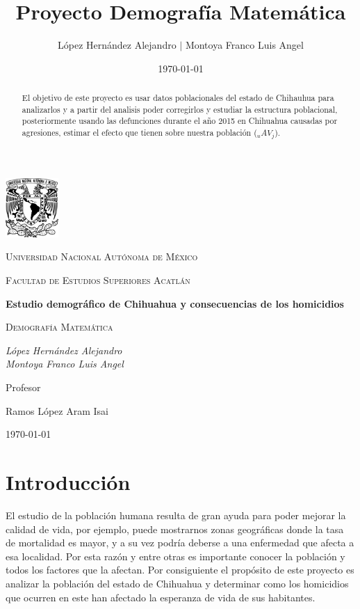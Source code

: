 \documentclass[fontsize=11pt]{article}
\title{Proyecto Demografía Matemática}
\author{  López Hernández Alejandro $|$ Montoya Franco Luis Angel} %
\date{\normalsize\today} %
\begin{document}
\begin{titlepage}
	\centering
	\includegraphics[width=0.15\textwidth]{UNAM}\par\vspace{1cm}
	{\scshape\LARGE Universidad Nacional Autónoma de México\par}
	\vspace{1cm}
	{\scshape\Large Facultad de Estudios Superiores Acatlán\par}
	\vspace{1.5cm}
	{\huge\bfseries Estudio demográfico de Chihuahua y consecuencias de los homicidios  \par}
	\vspace{2cm}
	{\scshape\Large Demografía Matemática\par}
	\vspace{2cm}
	{\Large\itshape López Hernández Alejandro \\ Montoya Franco Luis Angel\par}
	\vfill
	Profesor\par
	Ramos López Aram Isai

	\vfill

	{\large \today\par}
\end{titlepage}
\begin{abstract}
   El objetivo de este proyecto es usar datos poblacionales del estado de Chihauhua para analizarlos y a partir del analisis poder corregirlos y estudiar la estructura poblacional, posteriormente usando las defunciones durante el año 2015 en Chihuahua causadas por agresiones, estimar el efecto que tienen sobre nuestra población ($_u AV_{j}$). 
\end{abstract}

\section*{Introducción}
 El estudio de la población humana resulta de gran ayuda para poder mejorar la calidad de vida, por ejemplo, puede mostrarnos zonas geográficas donde la tasa de mortalidad es mayor, y a su vez podría deberse a una enfermedad que afecta a esa localidad. 
Por esta razón y entre otras es importante conocer la población y todos los factores que la afectan. 
Por consiguiente el propósito de este proyecto es analizar la población del estado de Chihuahua y determinar como los homicidios que ocurren en este han afectado la esperanza de vida de sus habitantes.
\\ 
\end{document}
